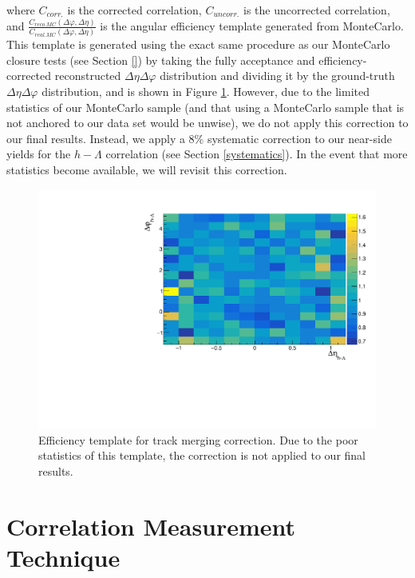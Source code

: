 \documentclass[ALICE,manyauthors]{ALICE_analysis_notes}
\begin{document}
where $C_{corr.}$ is the corrected correlation, $C_{uncorr.}$ is the uncorrected correlation, and $\frac{C_{reco. MC}(\Delta\varphi, \Delta\eta)}{C_{real. MC}(\Delta\varphi, \Delta\eta)}$ is the angular efficiency template generated from MonteCarlo. This template is generated using the exact same procedure as our MonteCarlo closure tests (see Section \ref{}) by taking the fully acceptance and efficiency-corrected reconstructed $\Delta\eta\Delta\varphi$ distribution and dividing it by the ground-truth $\Delta\eta\Delta\varphi$ distribution, and is shown in Figure \ref{trackmerge_efficiency_plot}. However, due to the limited statistics of our MonteCarlo sample (and that using a MonteCarlo sample that is not anchored to our data set would be unwise), we do not apply this correction to our final results. Instead, we apply a 8\% systematic correction to our near-side yields for the $h-\Lambda$ correlation (see Section \ref{systematics}). In the event that more statistics become available, we will revisit this correction.


\begin{figure}[ht]
\centering
\includegraphics[width=5in]{figures/trackmerge_efficiency_PLACEHOLDER.pdf}
\caption{Efficiency template for track merging correction. Due to the poor statistics of this template, the correction is not applied to our final results.}
\label{trackmerge_efficiency_plot}
\end{figure}

\section{Correlation Measurement Technique}
\label{corrsec}
\end{document}

